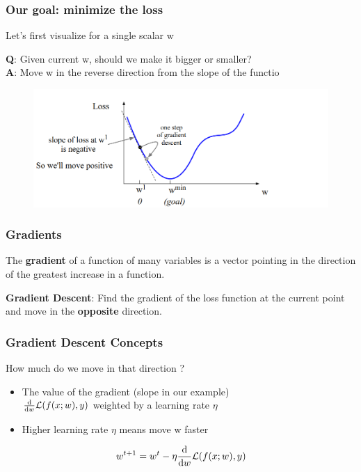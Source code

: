 \documentclass[13.5pt,aspecratio=169]{beamer}
\begin{document}
\begin{frame}
    \onehalfspacing
        \frametitle{Our goal: minimize the loss}
        {\Large Let's first visualize for a single scalar w}
        \begin{block}{}
            \textbf{Q}: Given current w, should we make it bigger or smaller? \\
            \textbf{A}: Move w in the reverse direction from the slope of the functio
        \end{block}
        \bigskip
            \begin{figure}
                \centering
                \includegraphics [scale=0.45] {visualize_2.png}
                
            \end{figure}
        
    \end{frame}
\begin{frame}
\onehalfspacing
	\frametitle{Gradients}
    \begin{block}{}
        The \textbf{gradient} of a function of many variables is a
vector pointing in the direction of the greatest
increase in a function.
    \end{block}

	\bigskip

    \begin{block}{}
        \textbf{Gradient Descent}: Find the gradient of the loss
function at the current point and move in the
\textbf{opposite} direction.
    \end{block}
\end{frame}

\begin{frame}
\onehalfspacing
	\frametitle{Gradient Descent Concepts}
    {\Large How much do we move in that direction ?}
    \bigskip
    \begin{itemize}
        \item The value of the gradient (slope in our example) \\ $ \dv{w} \mathcal{L} (f(x; w), y) $ weighted by a learning rate $\eta$
        \smallskip
        \item Higher learning rate $\eta$ means move w faster
    \end{itemize}

    {\fontsize{16}{20}\selectfont
    \begin{center} %
        \[ w^{t+1} =  w^t - \eta \dv{w} \mathcal{L} (f(x; w), y) \]
      \end{center}
    }
\end{frame}
\end{document}
